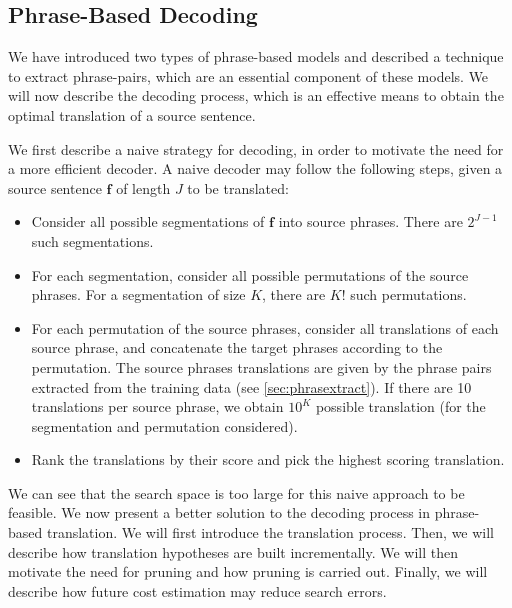 \subsection{Phrase-Based Decoding}


We have introduced two types of phrase-based
models and described a technique to extract
phrase-pairs, which are an essential component
of these models. We will now describe the decoding
process, which is an effective means to obtain
the optimal translation of a source sentence.

We first describe a naive strategy for decoding, in order
to motivate the need for a more efficient decoder.
A naive decoder may follow the following steps, given
a source sentence $\bm{f}$ of length $J$ to be translated:
%
\begin{itemize}
  \item Consider all possible segmentations of $\bm{f}$ into source phrases. There are $2^{J - 1}$ such segmentations.
  \item For each segmentation, consider all possible permutations of the source phrases. For a segmentation of size $K$, there are $K!$ such permutations.
  \item For each permutation of the source phrases, consider all translations of each source phrase, and concatenate the target
    phrases according to the permutation. The source phrases translations are given by the phrase pairs extracted from the training
    data (see \autoref{sec:phrasextract}). If there are 10 translations per source phrase, we obtain
    $10^K$ possible translation (for the segmentation and permutation considered).
  \item Rank the translations by their score and pick the highest scoring translation.
\end{itemize}
%
We can see that the search space is too large for this naive
approach to be feasible.
We now present a better solution to the decoding process in phrase-based translation.
We will first introduce the translation process. Then, we will
describe how translation hypotheses are built incrementally.
We will then motivate the need for pruning and how pruning
is carried out. Finally, we will describe how future cost estimation
may reduce search errors.

